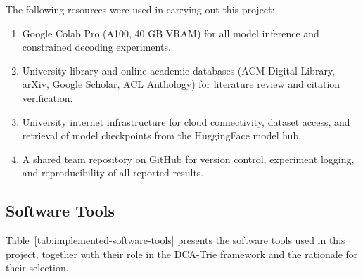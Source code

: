 The following resources were used in carrying out this project:

\begin{enumerate}[label=\roman*.]
  \item Google Colab Pro (A100, 40 GB VRAM) for all model inference and constrained decoding experiments.
  \item University library and online academic databases (ACM Digital Library, arXiv, Google Scholar, ACL Anthology) for literature review and citation verification.
  \item University internet infrastructure for cloud connectivity, dataset access, and retrieval of model checkpoints from the HuggingFace model hub.
  \item A shared team repository on GitHub for version control, experiment logging, and reproducibility of all reported results.
\end{enumerate}

\subsection{Software Tools}

Table~\ref{tab:implemented-software-tools} presents the software tools used in this project, together with their role in the DCA-Trie framework and the rationale for their selection.

